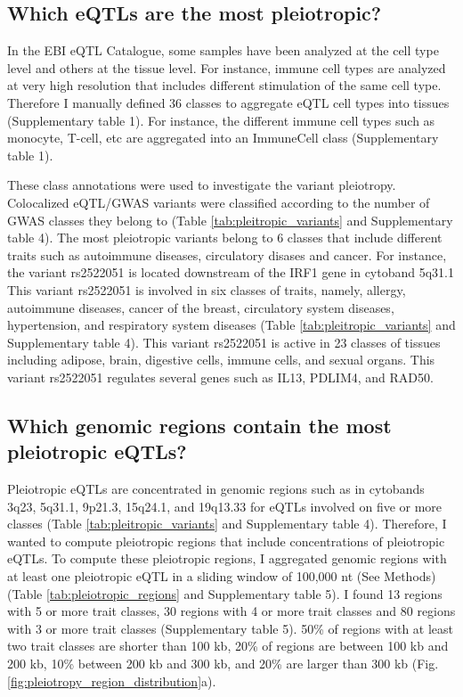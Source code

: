 \subsection*{Which eQTLs are the most pleiotropic?}

In the EBI eQTL Catalogue, some samples have been analyzed at the cell type level and others at the tissue level.
%
For instance, immune cell types are analyzed at very high resolution that includes different stimulation of the same cell type.
%
Therefore I manually defined 36 classes to aggregate eQTL cell types into tissues (Supplementary table 1).
%
For instance, the different immune cell types such as monocyte, T-cell, etc are aggregated into an ImmuneCell class (Supplementary table 1).

These class annotations were used to investigate the variant pleiotropy.
%
Colocalized eQTL/GWAS variants were classified according to the number of GWAS classes they belong to (Table \ref{tab:pleitropic_variants} and Supplementary table 4).
%
The most pleiotropic variants belong to 6 classes that include different traits such as autoimmune diseases, circulatory disases and cancer.
%
For instance, the variant rs2522051 is located downstream of the IRF1 gene in cytoband 5q31.1
%
This variant rs2522051 is involved in six classes of traits, namely,
allergy, autoimmune diseases, cancer of the breast, circulatory system diseases, hypertension, and respiratory system diseases
(Table \ref{tab:pleitropic_variants} and Supplementary table 4).
%
This variant rs2522051 is active in 23 classes of tissues including adipose, brain, digestive cells, immune cells, and sexual organs.
%
This variant rs2522051 regulates several genes such as IL13, PDLIM4, and RAD50.

\subsection*{Which genomic regions contain the most pleiotropic eQTLs?}

Pleiotropic eQTLs are concentrated in genomic regions such as in cytobands 3q23,
5q31.1, 9p21.3, 15q24.1, and 19q13.33 for eQTLs involved on five or more classes (Table \ref{tab:pleitropic_variants} and Supplementary table 4).
%
Therefore, I wanted to compute pleiotropic regions that include concentrations of pleiotropic eQTLs.
%
To compute these pleiotropic regions, I aggregated genomic regions with at least one pleiotropic eQTL in a sliding
window of 100,000 nt (See Methods) (Table \ref{tab:pleiotropic_regions} and Supplementary table 5).
%
I found 13 regions with 5 or more trait classes, 30 regions with 4 or more trait
classes and 80 regions with 3 or more trait classes (Supplementary table 5).
%
50\% of regions with at least two trait classes are shorter than 100 kb, 20\% of regions are
between 100 kb and 200 kb, 10\% between 200 kb and 300 kb, and 20\% are larger than 300 kb (Fig. \ref{fig:pleiotropy_region_distribution}a).

